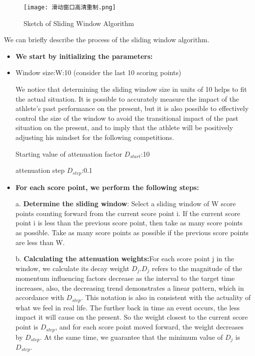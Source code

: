 \documentclass{mcmthesis}
\begin{document}
\begin{figure}[htbp]
    \centering
    \texttt{[image: 滑动窗口高清重制.png]}
    \caption{Sketch of Sliding Window Algorithm} \label{Figure 18}
\end{figure}

We can briefly describe the process of the sliding window algorithm.
\begin{itemize}
    \item {\bf We start by initializing the parameters:}
    \item 
    Window size:W:10 (consider the last 10 scoring points)

    We notice that determining the sliding window size in units of 10 helps to fit the actual
    situation. It is possible to accurately measure the impact of the athlete's past performance on
    the present, but it is also possible to effectively control the size of the window to avoid the
    transitional impact of the past situation on the present, and to imply that the athlete will be
    positively adjusting his mindset for the following competitions. 

    Starting value of attenuation factor $D_{start}$:10

    attenuation step $D_{step}$:0.1

    \item {\bf For each score point, we perform the following steps:}
    \item[a.]{\bf Determine the sliding window}: Select a sliding window of W score points counting
    forward from the current score point i. If the current score point i is less than the previous
    score point, then take as many score points as possible. Take as many score points as possible
    if the previous score points are less than W.
    \item[b.]{\bf Calculating the attenuation weights:}For each score point j in the window, we calculate
    its decay weight $D_{j}$.$D_{j}$ refers to the magnitude of the momentum influencing factors decrease
    as the interval to the target time increases, also, the decreasing trend demonstrates a linear
    pattern, which in accordance with $D_{step}$. This notation is also in consistent with the actuality of what we feel in real life. The further back in time an event occurs, the less impact it will
    cause on the present. So the weight closest to the current score point is $D_{step}$, and for each score point moved forward, the weight decreases by $D_{step}$. At the same time, we guarantee
    that the minimum value of $D_{j}$ is $D_{step}$.


\end{itemize}
\end{document}
